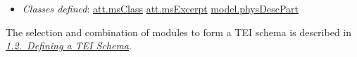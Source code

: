 \begin{description}
\begin{itemize}
\item {\itshape Classes defined}: \hyperref[TEI.att.msClass]{att.msClass} \hyperref[TEI.att.msExcerpt]{att.msExcerpt} \hyperref[TEI.model.physDescPart]{model.physDescPart}
\end{itemize} 
\end{description}  The selection and combination of modules to form a TEI schema is described in \textit{\hyperref[STIN]{1.2.\ Defining a TEI Schema}}.